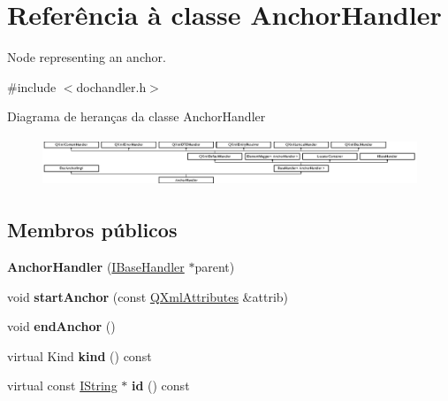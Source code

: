 \hypertarget{class_anchor_handler}{\section{Referência à classe Anchor\-Handler}
\label{class_anchor_handler}
}


Node representing an anchor.  




{\ttfamily \#include $<$dochandler.\-h$>$}

Diagrama de heranças da classe Anchor\-Handler\begin{figure}[H]
\begin{center}
\leavevmode
\includegraphics[height=1.461187cm]{class_anchor_handler}
\end{center}
\end{figure}
\subsection*{Membros públicos}
\begin{DoxyCompactItemize}
\item 
\hypertarget{class_anchor_handler_a6bb2c41056e6dcf6fcc4c9aad99655ad}{{\bfseries Anchor\-Handler} (\hyperlink{class_i_base_handler}{I\-Base\-Handler} $\ast$parent)}\label{class_anchor_handler_a6bb2c41056e6dcf6fcc4c9aad99655ad}

\item 
\hypertarget{class_anchor_handler_a13989618fc696558cb6fe547d7b58162}{void {\bfseries start\-Anchor} (const \hyperlink{class_q_xml_attributes}{Q\-Xml\-Attributes} \&attrib)}\label{class_anchor_handler_a13989618fc696558cb6fe547d7b58162}

\item 
\hypertarget{class_anchor_handler_af1003a9106437d3fa31091d86e6ff514}{void {\bfseries end\-Anchor} ()}\label{class_anchor_handler_af1003a9106437d3fa31091d86e6ff514}

\item 
\hypertarget{class_anchor_handler_af8e62c8a81ddf2283205cc8955de50eb}{virtual Kind {\bfseries kind} () const }\label{class_anchor_handler_af8e62c8a81ddf2283205cc8955de50eb}

\item 
\hypertarget{class_anchor_handler_acf656d73faffcdf0382f68eb78869cf4}{virtual const \hyperlink{class_i_string}{I\-String} $\ast$ {\bfseries id} () const }\label{class_anchor_handler_acf656d73faffcdf0382f68eb78869cf4}

\end{DoxyCompactItemize}
